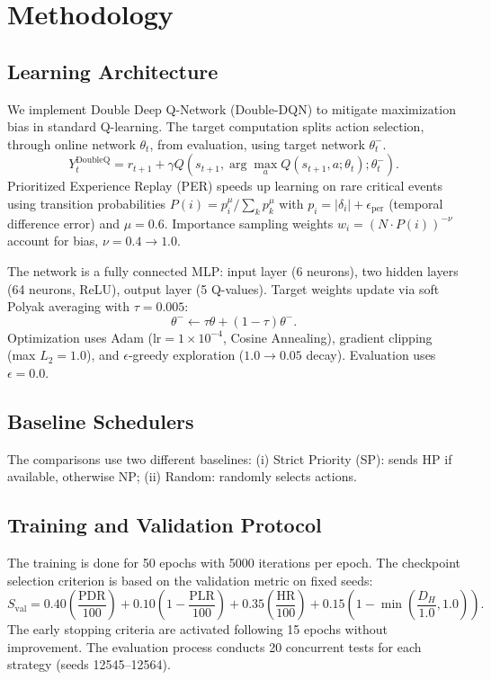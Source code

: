 \documentclass[runningheads]{llncs}
\begin{document}
\section{Methodology}
\subsection{Learning Architecture}
We implement Double Deep Q-Network (Double-DQN) to mitigate maximization bias in standard Q-learning. The target computation splits action selection, through online network $\theta_t$, from evaluation, using target network $\theta_t^{-}$.
\begin{equation}
 Y_t^{\mathrm{DoubleQ}}=r_{t+1}+\gamma Q\!\left(s_{t+1},\arg\max_a Q(s_{t+1},a;\theta_t);\theta_t^{-}\right).
 \label{eq:doubleq}
\end{equation}
Prioritized Experience Replay (PER) speeds up learning on rare critical events using transition probabilities $P(i)=p_i^{\mu}/\sum_k p_k^{\mu}$ with $p_i=|\delta_i|+\epsilon_{\mathrm{per}}$ (temporal difference error) and $\mu=0.6$. Importance sampling weights $w_i=(N\cdot P(i))^{-\nu}$ account for bias, $\nu=0.4\rightarrow1.0$.

The network is a fully connected MLP: input layer (6 neurons), two hidden layers (64 neurons, ReLU), output layer (5 Q-values). Target weights update via soft Polyak averaging with $\tau=0.005$:
\begin{equation}
 \theta^{-}\leftarrow\tau\theta+(1-\tau)\theta^{-}.
 \label{eq:polyak}
\end{equation}
Optimization uses Adam ($\mathrm{lr}=1\times10^{-4}$, Cosine Annealing), gradient clipping (max $L_2=1.0$), and $\epsilon$-greedy exploration ($1.0\rightarrow0.05$ decay). Evaluation uses $\epsilon=0.0$.

\subsection{Baseline Schedulers}
The comparisons use two different baselines: (i) Strict Priority (SP): sends HP if available, otherwise NP; (ii) Random: randomly selects actions.

\subsection{Training and Validation Protocol}
The training is done for 50 epochs with 5000 iterations per epoch. The checkpoint selection criterion is based on the validation metric on fixed seeds:
\begin{equation}
 S_{\mathrm{val}}=0.40\left(\frac{\mathrm{PDR}}{100}\right)+0.10\left(1-\frac{\mathrm{PLR}}{100}\right)+0.35\left(\frac{\mathrm{HR}}{100}\right)+0.15\left(1-\min\left(\frac{D_H}{1.0},1.0\right)\right).
 \label{eq:validation}
\end{equation}
The early stopping criteria are activated following 15 epochs without improvement. The evaluation process conducts 20 concurrent tests for each strategy (seeds 12545--12564).
\end{document}
